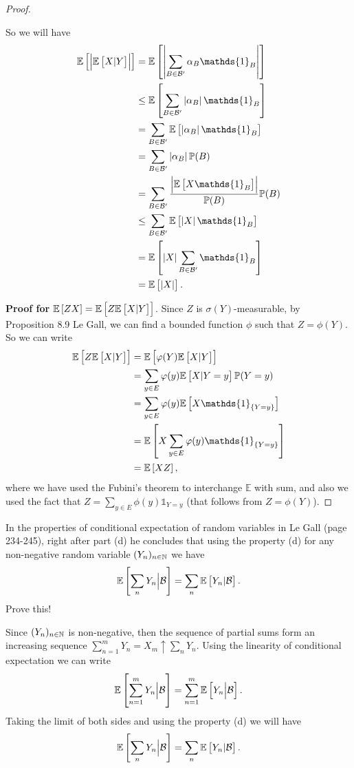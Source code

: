 \begin{proof}
\begin{itemize}
		So we will have
		\begin{align*}
			\E{\abs{\E{X|Y}}} &= \E{\abs{\sum_{B\in\mathcal{B}'} \alpha_B \mathds{1}_B }} \\
			&\leq \E{\sum_{B\in\mathcal{B}'}\abs{\alpha_B} \mathds{1}_B} \\
			&=\sum_{B\in\mathcal{B}'} \E{\abs{\alpha_B}\mathds{1}_B} \\
			&=\sum_{B\in\mathcal{B}'} \abs{\alpha_B} \prob(B) \\
			&=\sum_{B\in\mathcal{B}'} \frac{\abs{\E{X\mathds{1}_B}}}{\prob(B)}\prob(B) \\
			&\leq \sum_{B\in\mathcal{B}'} \E{\abs{X}\mathds{1}_B} \\
			&=\E{\abs{X}\sum_{B\in\mathcal{B}'}\mathds{1}_B} \\
			&=\E{\abs{X}}.
		\end{align*}
	\end{itemize}
	
	\noindent \textbf{Proof for $ \mathbb{E}\left[ZX\right] = \mathbb{E}\left[Z\mathbb{E}\left[X|Y\right]\right] $}. Since $ Z $ is $ \sigma(Y) $-measurable, by Proposition 8.9 Le Gall, we can find a bounded function $ \phi $ such that $ Z = \phi(Y) $. So we can write
	\begin{align*}
		\E{Z\E{X|Y}} &= \E{\phi(Y)\E{X|Y}} \\
		&= \sum_{y\in E} \phi(y) \E{X|Y=y}\prob(Y=y) \\
		&= \sum_{y\in E} \phi(y) \E{X\mathds{1}_{\set{Y=y}}}\\
		&= \E{X \sum_{y\in E} \phi(y) \mathds{1}_{\set{Y=y}} } \\
		&=\E{XZ},
	\end{align*}
	where we have used the Fubini's theorem to interchange $ \mathbb{E}  $ with sum, and also we used the fact that $ Z = \sum_{y\in E} \phi(y)\mathds{1}_{Y=y} $ (that follows from $ Z=\phi(Y) $).

\end{proof}


\begin{problem}
	In the properties of conditional expectation of random variables in Le Gall (page 234-245), right after part (d) he concludes that using the property (d) for any non-negative random variable $ (Y_n)_{n\in \mathbb{N}} $ we have
	\[ \mathbb{E}\left[\sum_n Y_n \big| \mathcal{B}\right] = \sum_n \mathbb{E}\left[Y_n|\mathcal{B}\right]. \]
	Prove this!
\end{problem}
\begin{solution}
	Since $ (Y_n)_{n\in \mathbb{N}} $ is non-negative, then the sequence of partial sums form an increasing sequence $\sum_{n=1}^{m}Y_n  = X_m\uparrow \sum_n Y_n $. Using the linearity of conditional expectation we can write
	\[ \mathbb{E}\left[\sum_{n=1}^{m} Y_n \big| \mathcal{B}\right] = \sum_{n=1}^{m} \mathbb{E}\left[Y_n \big| \mathcal{B}\right]. \]
	Taking the limit of both sides and using the property (d) we will have
	\[ \mathbb{E}\left[\sum_n Y_n \big| \mathcal{B}\right] = \sum_n \mathbb{E}\left[Y_n | \mathcal{B}\right]. \]
\end{solution}


